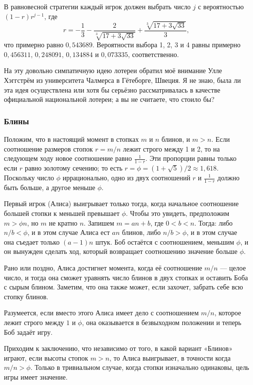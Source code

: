 В равновесной стратегии каждый игрок должен выбрать число $j$ с вероятностью $(1-r)r^{j-1}$, где 
\[r = -\frac13-\frac2{\sqrt[3]{17+3\sqrt{33}}}+\frac{\sqrt[3]{17+3\sqrt{33}}}3,\]
что примерно равно $0{,}543689$.
Вероятности выбора 1, 2, 3 и 4 равны примерно $0{,}456311$, $0{,}248091$, $0{,}134884$ и $0{,}073335$, соответственно.

На эту довольно симпатичную идею лотереи обратил моё внимание Улле Хэггстрём из университета Чалмерса в Гётеборге, Швеция. %
Я не знаю, была ли эта идея осуществлена или хотя бы серьёзно рассматривалась в качестве официальной национальной лотереи; а вы не считаете, что стоило бы?

\subsubsection*{Блины}%

Положим, что в настоящий момент в стопках $m$ и $n$ блинов, и $m > n$.
Если соотношение размеров стопок $r = m/n$ лежит строго между 1 и 2, то на следующем ходу новое соотношение равно $\tfrac1{1-r}$.
Эти пропорции равны только если $r$ равно золотому сечению;
то есть $r=\phi=(1+\sqrt{5})/2\approx 1{,}618$.
Поскольку число $\phi$ иррационально, одно из двух соотношений $r$ и $\tfrac1{1-r}$ должно быть больше, а другое меньше $\phi$.

Первый игрок (Алиса) выигрывает только тогда, когда начальное соотношение большей стопки к меньшей превышает $\phi$.
Чтобы это увидеть, предположим $m>\phi n$, но $m$ не кратно $n$.
Запишем $m=an+b$, где $0<b<n$.
Тогда: либо $n/b<\phi$, и в этом случае Алиса ест $an$ блинов, либо $n/b>\phi$, и в этом случае она съедает только $(a-1)n$ штук.
Боб остаётся с соотношением, меньшим $\phi$, и он вынужден сделать ход, который возвращает соотношению значение больше $\phi$.

Рано или поздно, Алиса достигнет момента, когда её соотношение $m/n$ --- целое число, и тогда она сможет уравнять число блинов в двух стопках и оставить Боба с сырым блином.
Заметим, что она также может, если захочет, забрать себе всю стопку блинов.

Разумеется, если вместо этого Алиса имеет дело с соотношением $m/n$, которое лежит строго между $1$ и $\phi$, она оказывается в безвыходном положении %
и теперь Боб задаёт игру.

Приходим к заключению, что независимо от того, в какой вариант «Блинов» играют, если высоты стопок $m>n$, то Алиса выигрывает, в точности когда $m/n>\phi$.
Только в тривиальном случае, когда стопки изначально одинаковы, цель игры имеет значение.\heart

